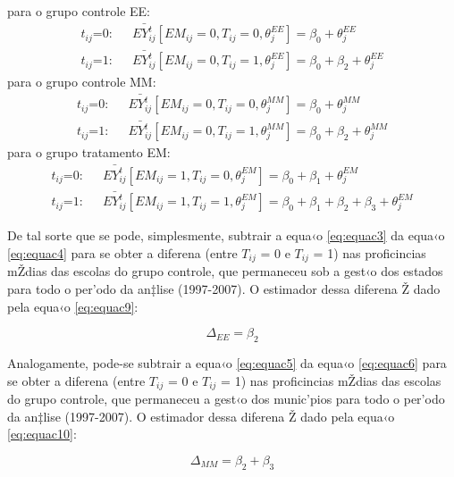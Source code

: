 \documentclass[a4paper, 12pt]{article}
\begin{document}
para o grupo controle EE:
\begin{eqnarray} 
\mbox{$t_{ij}$=0:}& & \bar{EY_{ij}^{t}}  [EM_{ij} = 0, T_{ij} = 0,  \theta_{j}^{EE}]  = \beta_0 +  \theta_{j}^{EE}
\label{eq:equac3}   \\ 
\mbox{$t_{ij}$=1:}& &\bar{EY_{ij}^{t}}  [EM_{ij} = 0, T_{ij} = 1,  \theta_{j}^{EE}]  = \beta_0 + \beta_2 +  \theta_{j}^{EE}
\label{eq:equac4}
\end{eqnarray}
para o grupo controle MM:
\begin{eqnarray}
\mbox{$t_{ij}$=0:}& & \bar{EY_{ij}^{t}}  [EM_{ij} = 0, T_{ij} = 0,  \theta_{j}^{MM}]  = \beta_0 +  \theta_{j}^{MM}
\label{eq:equac5}   \\ 
\mbox{$t_{ij}$=1:}& &  \bar{EY_{ij}^{t}}  [EM_{ij} = 0, T_{ij} = 1,  \theta_{j}^{MM}]  = \beta_0 +  \beta_2 +  \theta_{j}^{MM}
\label{eq:equac6} 
\end{eqnarray}
para o grupo tratamento EM:
\begin{eqnarray}
\mbox{$t_{ij}$=0:}& &  \bar{EY_{ij}^{t}}  [EM_{ij} = 1, T_{ij} = 0,  \theta_{j}^{EM}]  = \beta_0 +  \beta_1 +  \theta_{j}^{EM}
\label{eq:equac7}    \\
\mbox{$t_{ij}$=1:}& & \bar{EY_{ij}^{t}}  [EM_{ij} = 1, T_{ij} = 1,  \theta_{j}^{EM}]  = \beta_0 +  \beta_1 +  \beta_2 +  \beta_3 + \theta_{j}^{EM}
\label{eq:equac8}
\end{eqnarray}

De tal sorte que se pode, simplesmente, subtrair a equa‹o \ref{eq:equac3} da equa‹o \ref{eq:equac4} para se obter a diferena (entre $T_{ij}$ = 0 e $T_{ij}$ = 1) nas proficincias mŽdias das escolas do grupo controle, que permaneceu sob a gest‹o dos estados para todo o per’odo da an‡lise (1997-2007). O estimador dessa diferena Ž dado pela equa‹o \ref{eq:equac9}:

\begin{equation}
\Delta_{EE} =  \beta_2 \label{eq:equac9}
\end{equation}

Analogamente, pode-se subtrair a equa‹o \ref{eq:equac5} da equa‹o \ref{eq:equac6} para se obter a diferena (entre $T_{ij}$ = 0 e $T_{ij}$ = 1) nas proficincias mŽdias das escolas do grupo controle, que permaneceu a gest‹o dos munic’pios para todo o per’odo da an‡lise (1997-2007). O estimador dessa diferena Ž dado pela equa‹o \ref{eq:equac10}:

\begin{equation}
\Delta_{MM} =  \beta_2 + \beta_3 \label{eq:equac10}
\end{equation}
\end{document}
